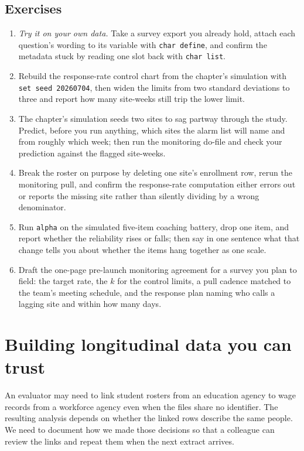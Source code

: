 \documentclass[
    a4paper,
    fontsize=10pt,
    twoside=true,
    numbers=noenddot,
]{kaobook}
\begin{document}
\section*{Exercises}
\begin{enumerate}
\item \emph{Try it on your own data.} Take a survey export you already hold, attach each question's wording to its variable with \texttt{char define}, and confirm the metadata stuck by reading one slot back with \texttt{char list}.
\item Rebuild the response-rate control chart from the chapter's simulation with \texttt{set seed 20260704}, then widen the limits from two standard deviations to three and report how many site-weeks still trip the lower limit.
\item The chapter's simulation seeds two sites to sag partway through the study. Predict, before you run anything, which sites the alarm list will name and from roughly which week; then run the monitoring do-file and check your prediction against the flagged site-weeks.
\item Break the roster on purpose by deleting one site's enrollment row, rerun the monitoring pull, and confirm the response-rate computation either errors out or reports the missing site rather than silently dividing by a wrong denominator.
\item Run \texttt{alpha} on the simulated five-item coaching battery, drop one item, and report whether the reliability rises or falls; then say in one sentence what that change tells you about whether the items hang together as one scale.
\item Draft the one-page pre-launch monitoring agreement for a survey you plan to field: the target rate, the $k$ for the control limits, a pull cadence matched to the team's meeting schedule, and the response plan naming who calls a lagging site and within how many days.
\end{enumerate}
\chapter{Building longitudinal data you can trust}\label{ch:panels}

An evaluator may need to link student rosters from an education agency to wage records from a workforce agency even when the files share no identifier. The resulting analysis depends on whether the linked rows describe the same people. We need to document how we made those decisions so that a colleague can review the links and repeat them when the next extract arrives.
\end{document}
